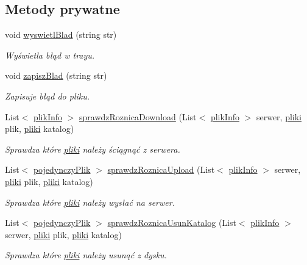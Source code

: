 \subsection*{Metody prywatne}
\begin{CompactItemize}
\item 
void \hyperlink{a00037_d94f9cb612f02daf94e197aae7a25c4d}{wyswietlBlad} (string str)
\begin{CompactList}\small\item\em Wyświetla błąd w trayu. \item\end{CompactList}\item 
void \hyperlink{a00037_b543bc78feea7f86bace90f920f17511}{zapiszBlad} (string str)
\begin{CompactList}\small\item\em Zapisuje błąd do pliku. \item\end{CompactList}\item 
List$<$ \hyperlink{a00018}{plikInfo} $>$ \hyperlink{a00037_55b06ff6e65c5b3668ddd5e299528beb}{sprawdzRoznicaDownload} (List$<$ \hyperlink{a00018}{plikInfo} $>$ serwer, \hyperlink{a00017}{pliki} plik, \hyperlink{a00017}{pliki} katalog)
\begin{CompactList}\small\item\em Sprawdza które \hyperlink{a00017}{pliki} należy ściągnąć z serwera. \item\end{CompactList}\item 
List$<$ \hyperlink{a00020}{pojedynczyPlik} $>$ \hyperlink{a00037_8f5d03264bce3d51a12bbda9b4fd464d}{sprawdzRoznicaUpload} (List$<$ \hyperlink{a00018}{plikInfo} $>$ serwer, \hyperlink{a00017}{pliki} plik, \hyperlink{a00017}{pliki} katalog)
\begin{CompactList}\small\item\em Sprawdza które \hyperlink{a00017}{pliki} należy wysłać na serwer. \item\end{CompactList}\item 
List$<$ \hyperlink{a00020}{pojedynczyPlik} $>$ \hyperlink{a00037_a1c9556bf17ca6296a65c8ce4c2e345a}{sprawdzRoznicaUsunKatalog} (List$<$ \hyperlink{a00018}{plikInfo} $>$ serwer, \hyperlink{a00017}{pliki} plik, \hyperlink{a00017}{pliki} katalog)
\begin{CompactList}\small\item\em Sprawdza które \hyperlink{a00017}{pliki} należy usunąć z dysku. \item\end{CompactList}\item 

\end{CompactItemize}
